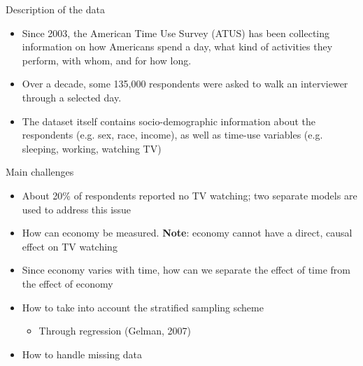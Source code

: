 \documentclass[final]{beamer}
\newcounter{acolumn}%
\begin{document}
\begin{frame}
\begin{acolumns}[t]
          \begin{column}{.24\linewidth}
            \begin{block}{Description of the data}
              \begin{itemize}
              	\item Since 2003, the American Time Use Survey (ATUS) has been collecting information on how Americans spend a day, what kind of activities they perform, with whom, and for how long.
              	\item Over a decade, some 135,000 respondents were asked to walk an interviewer through a selected day.
              	\item The dataset itself contains socio-demographic information about the respondents (e.g. sex, race, income), as well as time-use variables (e.g. sleeping, working, watching TV)
              \end{itemize}
              
            \end{block}
    
          
          
          \begin{block}{Main challenges}
                  		  \begin{itemize}
                  		  	\item About 20\% of respondents reported no TV watching; two separate models are used to address this issue
                  		  	
                  		  	\item How can economy be measured. \textbf{Note}: economy cannot have a direct, causal effect on TV watching
                  		  	
                  		  	\item Since economy varies with time, how can we separate the effect of time from the effect of economy
                  		  	
                  		  	\item How to take into account the stratified sampling scheme
                  		  	\begin{itemize}
                  		  		\item Through regression (Gelman, 2007)
                  		  	\end{itemize}
                  		  	
                  		  	\item How to handle missing data
                  		  \end{itemize}
                  			

\end{block}
\end{column}
\end{acolumns}
\end{frame}
\end{document}
